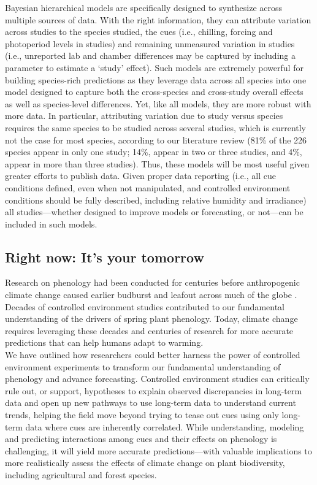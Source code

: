 \documentclass[11pt,letter]{article}
\begin{document}
Bayesian hierarchical models are specifically designed to synthesize across multiple sources of data. With the right information, they can attribute variation across studies to the species studied, the cues (i.e., chilling, forcing and photoperiod levels in studies) and remaining unmeasured variation in studies (i.e., unreported lab and chamber differences may be captured by including a parameter to estimate a `study' effect). Such models are extremely powerful for building species-rich predictions as they leverage data across all species into one model designed to capture both the cross-species and cross-study overall effects as well as species-level differences. Yet, like all models, they are more robust with more data. In particular, attributing variation due to study versus species requires the same species to be studied across several studies, which is currently not the case for most species, according to our literature review (81\% of the 226 species appear in only one study; 14\%, appear in two or  three studies, and 4\%, appear in more than three studies). Thus, these models will be most useful given greater efforts to publish data. Given proper data reporting (i.e., all cue conditions defined, even when not manipulated, and controlled environment conditions should be fully described, including relative humidity and irradiance) all studies---whether designed to improve models or forecasting, or not---can be included in such models. 

\subsection{Right now: It's your tomorrow}
Research on phenology had been conducted for centuries before anthropogenic climate change caused earlier budburst and leafout across much of the globe \citep{Lamb:1948aa,Sparks:1995mv}. Decades of controlled environment studies contributed to our fundamental understanding of the drivers of spring plant phenology. Today, climate change requires leveraging these decades and centuries of research for more accurate predictions that can help humans adapt to warming. \\

We have outlined how researchers could better harness the power of controlled environment experiments to transform our fundamental understanding of phenology and advance forecasting. Controlled environment studies can critically rule out, or support, hypotheses to explain observed discrepancies in long-term data and open up new pathways to use long-term data to understand current trends, helping the field move beyond trying to tease out cues using only long-term data where cues are inherently correlated. While understanding, modeling and predicting interactions among cues and their effects on phenology is challenging, it will yield more accurate predictions---with valuable implications to more realistically assess the effects of climate change on plant biodiversity, including agricultural and forest species. 
\end{document}

